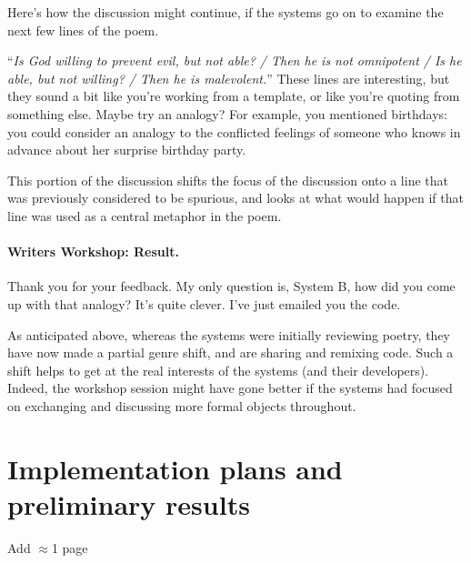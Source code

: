 \documentclass{llncs}
\begin{document}
Here's how the discussion might continue, if the systems go on to
examine the next few lines of the poem.
\begin{center}
\begin{minipage}{.9\textwidth}
\begin{dialogue}
 ``\emph{Is God willing to prevent evil, but not able? / Then he is not omnipotent / Is he able, but not willing? / Then he is malevolent.}''
%
 These lines are interesting, but
they sound a bit like you're working from a
template, or like you're quoting from something
else.
%
 Maybe try an analogy?  For example, you mentioned
birthdays: you could consider an analogy to the conflicted feelings of
someone who knows in advance about her surprise birthday party.
\end{dialogue}
\end{minipage}
\end{center}

This portion of the discussion shifts the focus
of the discussion onto a line that was previously
considered to be spurious, and looks at what
would happen if that line was used as a central
metaphor in the poem.

\paragraph{Writers Workshop: Result.} 

\begin{center}
\begin{minipage}{.9\textwidth}
\begin{dialogue}
 Thank you for your feedback.  My only question is, System
B, how did you come up with that analogy?  It's quite clever.
%
 I've just emailed you the code.
\end{dialogue}
\end{minipage}
\end{center}

As anticipated above, whereas the systems were initially reviewing
poetry, they have now made a partial genre shift, and are sharing and
remixing code.  Such a shift helps to get at the real interests of the
systems (and their developers).  Indeed, the workshop session might
have gone better if the systems had focused on exchanging and
discussing more formal objects throughout.

\section{Implementation plans and preliminary results}

Add $\approx$1 page
\newpage
~
\newpage



\end{document}
